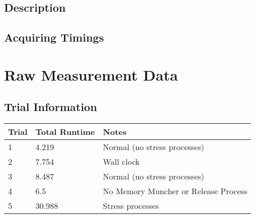\documentclass[12pt]{report}
\begin{document}
\section{Description}

\section{Acquiring Timings}





\appendix
\chapter{Raw Measurement Data}
\label{appendix:raw_data}

\section{Trial Information}

\begin{tabular}{l | l | l}
    Trial&Total Runtime&Notes \\
    \hline
    1&4.219&Normal (no stress processes) \\
    2&7.754&Wall clock \\
    3&8.487&Normal (no stress processes)\\
    4&6.5&No Memory Muncher or Release Process \\
    5&30.988&Stress processes \\
\end{tabular}
\end{document}
